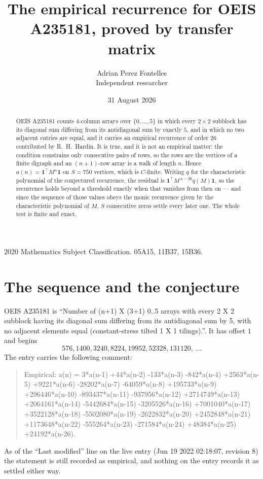 \documentclass[11pt,a4paper]{article}
\title{The empirical recurrence for OEIS A235181, proved by transfer matrix}
\author{Adrian Perez Fontelles\\ \small Independent researcher}
\date{31 August 2026}
\theoremstyle{plain}
\theoremstyle{definition}
\begin{document}
\maketitle

\begin{abstract}
OEIS A235181 counts $4$-column arrays over $\{0,\dots,5\}$ in which every
$2\times2$ subblock has its diagonal sum differing from its antidiagonal sum by
exactly $5$, and in which no two adjacent entries are equal, and it
carries an empirical recurrence of order $26$ contributed by R.~H.~Hardin. It is true,
and it is not an empirical matter: the condition constrains only consecutive pairs of rows,
so the rows are the vertices of a finite digraph and an $(n+1)$-row array is a walk of
length $n$. Hence $a(n)=\mathbf{1}^{\!\top}M^{n}\mathbf{1}$ on $S=750$ vertices, which
is $C$-finite. Writing $q$ for the characteristic polynomial of the conjectured recurrence,
the residual is $\mathbf{1}^{\!\top}M^{\,n-26}q(M)\mathbf{1}$, so the recurrence
holds beyond a threshold exactly when that vanishes from then on --- and since the sequence
of those values obeys the monic recurrence given by the characteristic polynomial of $M$,
$S$ consecutive zeros settle every later one. The whole test is finite and exact.
\end{abstract}

\noindent\small 2020 Mathematics Subject Classification. 05A15, 11B37, 15B36.\normalsize

\section{The sequence and the conjecture}

OEIS A235181 is ``Number of (n+1) X (3+1) 0..5 arrays with every 2 X 2 subblock having its diagonal sum differing from its antidiagonal sum by 5, with no adjacent elements equal (constant-stress tilted 1 X 1 tilings).''. It has offset
$1$ and begins
\[
576, 1400, 3240, 8224, 19952, 52328, 131120,\ \dots
\]
The entry carries the following comment:
\begin{quote}\small
Empirical: a(n) = 3*a(n-1) +44*a(n-2) -133*a(n-3) -842*a(n-4) +2563*a(n-5) +9221*a(n-6) -28202*a(n-7) -64059*a(n-8) +195733*a(n-9) +296446*a(n-10) -893437*a(n-11) -937956*a(n-12) +2714749*a(n-13) +2064161*a(n-14) -5442684*a(n-15) -3205526*a(n-16) +7001040*a(n-17) +3522128*a(n-18) -5502080*a(n-19) -2622832*a(n-20) +2452848*a(n-21) +1173648*a(n-22) -555264*a(n-23) -271584*a(n-24) +48384*a(n-25) +24192*a(n-26).
\end{quote}
As of the ``Last modified'' line on the live entry (Jun 19 2022 02:18:07, revision 8) the statement is
still recorded as empirical, and nothing on the entry records it as settled either way.
\end{document}
